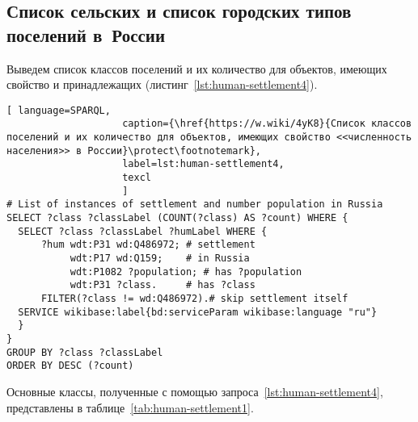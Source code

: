 \subsection{Список сельских и список городских типов поселений в~России}

Выведем список классов поселений и их количество для объектов, 
имеющих свойство  
и принадлежащих  (листинг~\ref{lst:human-settlement4}). 

\begin{lstlisting}[ language=SPARQL, 
                    caption={\href{https://w.wiki/4yK8}{Список классов поселений и их количество для объектов, имеющих свойство <<численность населения>> в России}\protect\footnotemark},
                    label=lst:human-settlement4,
                    texcl 
                    ]
# List of instances of settlement and number population in Russia
SELECT ?class ?classLabel (COUNT(?class) AS ?count) WHERE {
  SELECT ?class ?classLabel ?humLabel WHERE {
      ?hum wdt:P31 wd:Q486972; # settlement
           wdt:P17 wd:Q159;    # in Russia
           wdt:P1082 ?population; # has ?population
           wdt:P31 ?class.     # has ?class
      FILTER(?class != wd:Q486972).# skip settlement itself
  SERVICE wikibase:label{bd:serviceParam wikibase:language "ru"}
  }
}
GROUP BY ?class ?classLabel
ORDER BY DESC (?count)
\end{lstlisting}%

Основные классы, полученные с помощью запроса~\ref{lst:human-settlement4}, представлены в таблице~\ref{tab:human-settlement1}.


